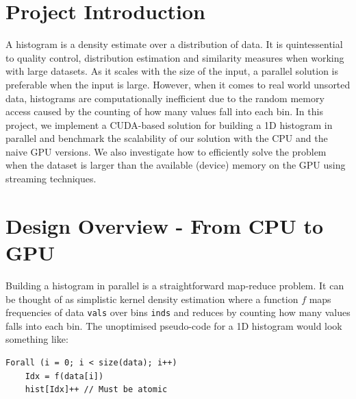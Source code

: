 \documentclass[12pt, a4paper, hidelinks]{article}
\renewcommand{\tt}[1]{\texttt{#1}}
\begin{document}

\tableofcontents
\newpage

\section{Project Introduction}
A histogram is a density estimate over a distribution of data.
It is quintessential to quality control, distribution estimation
and similarity measures when working with large datasets.
As it scales with the size of the input,
a parallel solution is preferable when the input is large.
However, when it comes to real world unsorted data,
histograms are computationally inefficient
due to the random memory access caused by
the counting of how many values fall into each bin.
In this project, we implement a CUDA-based solution for building a 1D histogram
in parallel and benchmark the scalability of our solution with
the CPU and the naive GPU versions.
We also investigate how to efficiently solve the problem when the dataset
is larger than the available (device) memory on the GPU
using streaming techniques.

\section{Design Overview - From CPU to GPU}
Building a histogram in parallel is a straightforward map-reduce problem.
It can be thought of as simplistic kernel density estimation
where a function $f$ maps frequencies of data \tt{vals} over bins \tt{inds}
and reduces by counting how many values falls into each bin.
The unoptimised pseudo-code for a 1D histogram
would look something like:

\begin{verbatim}
Forall (i = 0; i < size(data); i++)
    Idx = f(data[i])
    hist[Idx]++ // Must be atomic
\end{verbatim}
\end{document}
